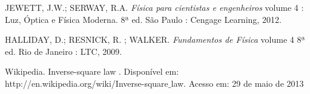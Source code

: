 \documentclass[a4paper,11pt]{article}
\begin{document}
\begin{thebibliography}{9}    
  		JEWETT, J.W.; SERWAY, R.A.
  		\emph{Física para cientistas e engenheiros} volume 4 : Luz, Óptica e Física Moderna.
 		 8ª ed.
 		 São Paulo : Cengage Learning, 2012.
 		 
  		HALLIDAY, D.; RESNICK, R. ; WALKER.
  		\emph{Fundamentos de Física} volume 4
 		 8ª ed.
 		 Rio de Janeiro : LTC, 2009.
 	
 			Wikipedia. Inverse-square law . Disponível em: http://en.wikipedia.org/wiki/Inverse-square$\_$law. Acesso em: 29 de maio de 2013

\end{thebibliography}
\end{document}

